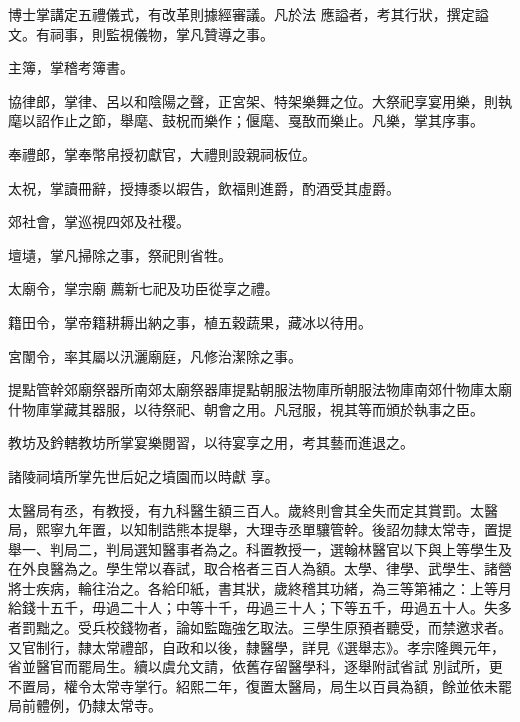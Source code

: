 \begin{pinyinscope}
 博士掌講定五禮儀式，有改革則據經審議。凡於法
 應謚者，考其行狀，撰定謚文。有祠事，則監視儀物，掌凡贊導之事。



 主簿，掌稽考簿書。



 協律郎，掌律、呂以和陰陽之聲，正宮架、特架樂舞之位。大祭祀享宴用樂，則執麾以詔作止之節，舉麾、鼓柷而樂作；偃麾、戛敔而樂止。凡樂，掌其序事。



 奉禮郎，掌奉幣帛授初獻官，大禮則設親祠板位。



 太祝，掌讀冊辭，授摶黍以嘏告，飲福則進爵，酌酒受其虛爵。



 郊社會，掌巡視四郊及社稷。



 壇壝，掌凡掃除之事，祭祀則省牲。



 太廟令，掌宗廟
 薦新七祀及功臣從享之禮。



 籍田令，掌帝籍耕耨出納之事，植五穀蔬果，藏冰以待用。



 宮闈令，率其屬以汛灑廟庭，凡修治潔除之事。



 提點管幹郊廟祭器所南郊太廟祭器庫提點朝服法物庫所朝服法物庫南郊什物庫太廟什物庫掌藏其器服，以待祭祀、朝會之用。凡冠服，視其等而頒於執事之臣。



 教坊及鈐轄教坊所掌宴樂閱習，以待宴享之用，考其藝而進退之。



 諸陵祠墳所掌先世后妃之墳園而以時獻
 享。



 太醫局有丞，有教授，有九科醫生額三百人。歲終則會其全失而定其賞罰。太醫局，熙寧九年置，以知制誥熊本提舉，大理寺丞單驤管幹。後詔勿隸太常寺，置提舉一、判局二，判局選知醫事者為之。科置教授一，選翰林醫官以下與上等學生及在外良醫為之。學生常以春試，取合格者三百人為額。太學、律學、武學生、諸營將士疾病，輪往治之。各給印紙，書其狀，歲終稽其功緒，為三等第補之：上等月給錢十五千，毋過二十人；中等十千，毋過三十人；下等五千，毋過五十人。失多者罰黜之。受兵校錢物者，論如監臨強乞取法。三學生原預者聽受，而禁邀求者。又官制行，隸太常禮部，自政和以後，隸醫學，詳見《選舉志》。孝宗隆興元年，省並醫官而罷局生。續以虞允文請，依舊存留醫學科，逐舉附試省試
 別試所，更不置局，權令太常寺掌行。紹熙二年，復置太醫局，局生以百員為額，餘並依未罷局前體例，仍隸太常寺。




\end{pinyinscope}
